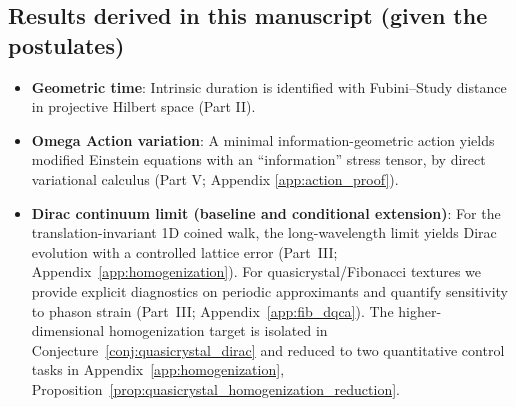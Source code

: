 \subsection{Results derived in this manuscript (given the postulates)}
\begin{itemize}
    \item \textbf{Geometric time}: Intrinsic duration is identified with Fubini--Study distance in projective Hilbert space (Part II).
    \item \textbf{Omega Action variation}: A minimal information-geometric action yields modified Einstein equations with an ``information'' stress tensor, by direct variational calculus (Part V; Appendix \ref{app:action_proof}).
    \item \textbf{Dirac continuum limit (baseline and conditional extension)}: For the translation-invariant 1D coined walk, the long-wavelength limit yields Dirac evolution with a controlled lattice error (Part~III; Appendix~\ref{app:homogenization}). For quasicrystal/Fibonacci textures we provide explicit diagnostics on periodic approximants and quantify sensitivity to phason strain (Part~III; Appendix~\ref{app:fib_dqca}). The higher-dimensional homogenization target is isolated in Conjecture~\ref{conj:quasicrystal_dirac} and reduced to two quantitative control tasks in Appendix~\ref{app:homogenization}, Proposition~\ref{prop:quasicrystal_homogenization_reduction}.
\end{itemize}

